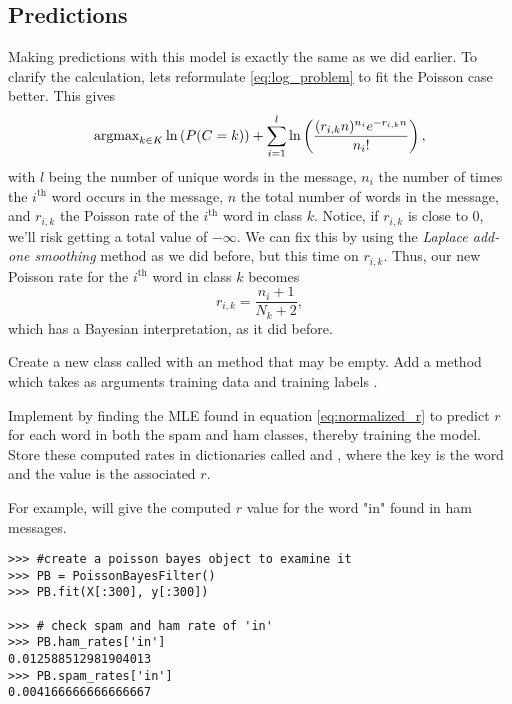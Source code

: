 \subsection*{Predictions}
Making predictions with this model is exactly the same as we did earlier.
To clarify the calculation, lets reformulate \ref{eq:log_problem} to fit the Poisson case better. 
This gives
\begin{equation}\label{eq:poisson_prob}
\mbox{argmax}_{k\in K}\ln\left(P(C=k)\right) + \sum_{i=1}^{l}\ln\left(\frac{(r_{i,k}n)^{n_i}e^{-r_{i,k}n}}{n_i!}\right),
\end{equation}
with $l$ being the number of unique words in the message, $n_i$ the number of times the $i^{\text{th}}$ word occurs in the message, $n$ the total number of words in the message, and $r_{i,k}$ the Poisson rate of the $i^{\text{th}}$ word in class $k$.
Notice, if $r_{i,k}$ is close to $0$, we'll risk getting a total value of $-\infty$.
We can fix this by using the \emph{Laplace add-one smoothing} method as we did before, but this time on $r_{i,k}$.
Thus, our new Poisson rate for the $i^{\text{th}}$ word in class $k$ becomes
\begin{equation}\label{eq:normalized_r}
    r_{i,k} = \frac{n_i + 1}{N_k + 2},
\end{equation}
which has a Bayesian interpretation, as it did before.

\begin{problem}
Create a new class called  with an  method that may be empty.
Add a  method which takes as arguments training data  and training labels .

Implement  by finding the MLE found in equation \ref{eq:normalized_r} to predict $r$ for each word in both the spam and ham classes, thereby training the model.
Store these computed rates in dictionaries called  and , where the key is the word and the value is the associated $r$. 

For example,  will give the computed $r$ value for the word "in" found in ham messages.
\begin{lstlisting}
>>> #create a poisson bayes object to examine it
>>> PB = PoissonBayesFilter()
>>> PB.fit(X[:300], y[:300])

>>> # check spam and ham rate of 'in'
>>> PB.ham_rates['in']
0.012588512981904013
>>> PB.spam_rates['in']
0.004166666666666667
\end{lstlisting}
\end{problem}

